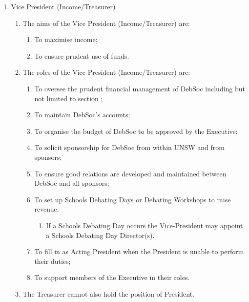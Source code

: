 \begin{enumerate}
\item Vice President (Income/Treasurer)
  \begin{enumerate}
  \item The aims of the Vice President (Income/Treasurer) are:
    \begin{enumerate}
    \item To maximise income;
    \item To ensure prudent use of funds.
    \end{enumerate}
  \item The roles of the Vice President (Income/Treasurer) are:
    \begin{enumerate}
    \item To oversee the prudent financial management of DebSoc including but not limited to section ;
    \item To maintain DebSoc’s accounts;
    \item To organise the budget of DebSoc to be approved by the Executive;
    \item To solicit sponsorship for DebSoc from within UNSW and from sponsors;
    \item To ensure good relations are developed and maintained between DebSoc and all sponsors;
    \item To set up Schools Debating Days or Debating Workshops to raise revenue.
      \begin{enumerate}
      \item If a Schools Debating Day occurs the Vice-President may appoint a Schools Debating Day Director(s).
      \end{enumerate}
    \item To fill in as Acting President when the President is unable to perform their duties;
    \item To support members of the Executive in their roles.
    \end{enumerate}
  \item The Treasurer cannot also hold the position of President.
  \end{enumerate}


\end{enumerate}
